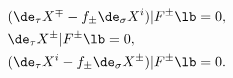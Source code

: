 \begin{equation}
\begin{split}
&(\de_{\tau}X^\mp-f_\pm \de_{\sigma}X^i)|F^\pm \lb=0,\\
&\de_{\tau}X^\pm |F^\pm \lb=0,\\
&(\de_{\tau}X^i-f_\pm \de_{\sigma} X^\pm ) |F^\pm \lb=0.
\end{split}
\end{equation}

